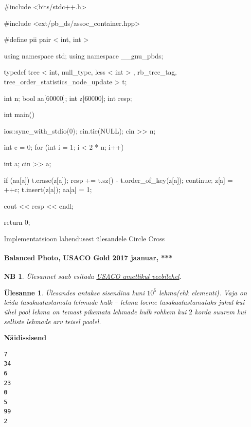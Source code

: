 \documentclass{trkut}
\newtheorem*{extra}{NB}
\newtheorem*{Text}{Ülesanne}
\begin{document}
\begin{cclol}
#include <bits/stdc++.h>

#include <ext/pb_ds/assoc_container.hpp>

#define pii pair < int, int >

 using namespace std;
using namespace __gnu_pbds;

typedef tree < int, null_type, less < int > , 
rb_tree_tag, tree_order_statistics_node_update > t;

int n;
bool aa[60000];
int z[60000];
int resp;

int main() {
  ios::sync_with_stdio(0);
  cin.tie(NULL);
  cin >> n;

  int c = 0;
  for (int i = 1; i < 2 * n; i++) {
    int a;
    cin >> a;

    if (aa[a]) {
      t.erase(z[a]);
      resp += t.sz() - t.order_of_key(z[a]);
      continue;
    }
    z[a] = ++c;
    t.insert(z[a]);
    aa[a] = 1;
  }

  cout << resp << endl;

  return 0;
}
\end{cclol}
\begin{kk}[H]%
    \caption{Implementatsioon lahendusest ülesandele Circle Cross}%
    \label{EMaxx}%
    \end{kk}



\paragraph{Balanced Photo, USACO Gold 2017 jaanuar, ***}
\begin{extra}
Ülesannet saab esitada \href{http://www.usaco.org/index.php?page=viewproblem2&cpid=693}{USACO ametlikul veebilehel}.
\end{extra}
\begin{Text}
Ülesandes antakse sisendina kuni $10^5$ lehma(ehk elementi).
Vaja on leida tasakaalustamata lehmade hulk -- lehma loeme tasakaalustamataks juhul kui ühel pool lehma on temast pikemata lehmade hulk rohkem kui $2$ korda suurem kui selliste lehmade arv teisel poolel.

\parencite{25}
\end{Text}



\textbf{Näidissisend}

\begin{verbatim}
7
34
6
23
0
5
99
2
\end{verbatim}
\end{document}
